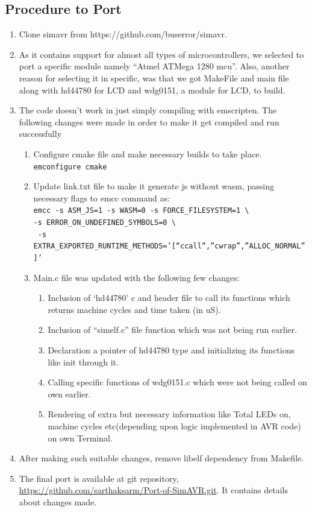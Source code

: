 \documentclass[12pt]{article}
\begin{document}
\subsection{Procedure to Port}
\begin{enumerate}
 \item Clone simavr from https://github.com/buserror/simavr.
 \item As it contains support for almost all types of microcontrollers, we selected to port a specific module namely “Atmel ATMega 1280 mcu”. Also, another reason for selecting it in specific, was that we got MakeFile and main file along with hd44780 for LCD and wdg0151, a module for LCD, to build.
 \item The code doesn’t work in just simply compiling with emscripten. The following changes were made in order to make it get compiled and run successfully
 \begin{enumerate}
 \item Configure cmake file and make necessary builds to take place.\\
 \texttt{emconfigure cmake}
 \item Update link.txt file to make it generate js without wasm, passing necessary flags to emcc command as: \\
 \texttt{emcc -s ASM\_JS=1 -s WASM=0 -s FORCE\_FILESYSTEM=1 \textbackslash}\\
 \texttt{-s ERROR\_ON\_UNDEFINED\_SYMBOLS=0 \textbackslash}\\
 \texttt{ -s EXTRA\_EXPORTED\_RUNTIME\_METHODS=’[“ccall”,”cwrap”,”ALLOC\_NORMAL”]’}
  \item Main.c file was updated with the following few changes:
 \begin{enumerate}
 \item Inclusion of ‘hd44780’ c and header file to call its functions which returns machine cycles and time taken (in uS). 
 \item Inclusion of “simelf.c” file function which was not being run earlier.
 \item Declaration a pointer of hd44780 type and initializing its functions like init through it.
 \item Calling specific functions of wdg0151.c which were not being called on own earlier.
 \item Rendering of extra but necessary information like Total LEDs on, machine cycles etc(depending upon logic implemented in AVR code) on own Terminal.
 \end{enumerate}
 \end{enumerate}
 \item After making such suitable changes, remove libelf dependency from Makefile.
 \item The final port is available at git repository, \url{https://github.com/sarthaksarm/Port-of-SimAVR.git}.
It contains details about changes made.

\end{enumerate}
\end{document}
